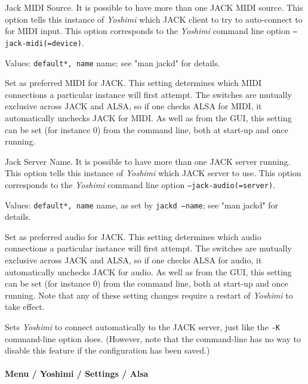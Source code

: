    \setcounter{ItemCounter}{0}      %

   Jack MIDI Source.
   It is possible to have more than one JACK MIDI source.  This option
   tells this instance of \textsl{Yoshimi} which JACK
   client to try to auto-connect to for MIDI input.
   This option corresponds to the \textsl{Yoshimi} command line option
   \texttt{--jack-midi(=device)}.

   Values: \texttt{default*, name} name; see "man jackd" for details.

   Set as preferred MIDI for JACK.
   This setting determines which MIDI connections a particular instance will
   first attempt. The switches are mutually exclusive across JACK and ALSA,
   so if one checks ALSA for MIDI, it automatically unchecks JACK for MIDI.
   As well as from the GUI, this setting can be set (for instance 0) from the
   command line, both at start-up and once running.

   Jack Server Name.
   It is possible to have more than one JACK server running.  This option
   tells this instance of \textsl{Yoshimi} which JACK server to use.
   This option corresponds to the \textsl{Yoshimi} command line option
   \texttt{--jack-audio(=server)}.

   Values: \texttt{default*, name} name, as set by
   \texttt{jackd --name}; see "man jackd" for details.

   Set as preferred audio for JACK.
   This setting determines which audio connections a particular instance will
   first attempt. The switches are mutually exclusive across JACK and ALSA,
   so if one checks ALSA for audio, it automatically unchecks JACK for audio.
   As well as from the GUI, this setting can be set (for instance 0) from the
   command line, both at start-up and once running.
   Note that any of these setting changes require a restart of \textsl{Yoshimi}
   to take effect.

   Sets \textsl{Yoshimi} to connect automatically to the JACK server, just like
   the \texttt{-K} command-line option does.
   (However, note that the command-line has no way to disable this feature if
   the configuration has been saved.)

\paragraph{Menu / Yoshimi / Settings / Alsa}
\label{paragraph:menu_yoshimi_settings_alsa_tab}

